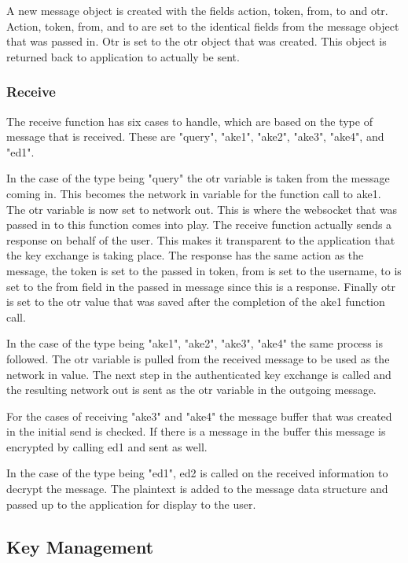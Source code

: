 A new message object is created with the fields action, token, from, to and otr. Action, token, from, and to are set to the identical fields from the message object that was passed in. Otr is set to the otr object that was created. This object is returned back to application to actually be sent.


\subsubsection{Receive}


The receive function has six cases to handle, which are based on the type of message that is received. These are "query", "ake1", "ake2", "ake3", "ake4", and "ed1".


In the case of the type being "query" the otr variable is taken from the message coming in. This becomes the network in variable for the function call to ake1. The otr variable is now set to network out. This is where the websocket that was passed in to this function comes into play. The receive function actually sends a response on behalf of the user. This makes it transparent to the application that the key exchange is taking place. The response has the same action as the message, the token is set to the passed in token, from is set to the username, to is set to the from field in the passed in message since this is a response. Finally otr is set to the otr value that was saved after the completion of the ake1 function call.


In the case of the type being "ake1", "ake2", "ake3", "ake4" the same process is followed. The otr variable is pulled from the received message to be used as the network in value. The next step in the authenticated key exchange is called and the resulting network out is sent as the otr variable in the outgoing message.


For the cases of receiving "ake3" and "ake4" the message buffer that was created in the initial send is checked. If there is a message in the buffer this message is encrypted by calling ed1 and sent as well. 


In the case of the type being "ed1", ed2 is called on the received information to decrypt the message. The plaintext is added to the message data structure and passed up to the application for display to the user.


\subsection{Key Management}


